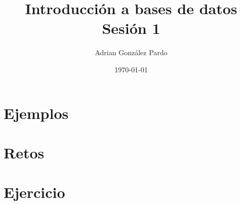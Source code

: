 \documentclass[10pt]{article}
\title{Introducción a bases de datos\\Sesión 1}
\author{Adrian González Pardo}
\date{\today}
\begin{document}
\maketitle
\section{Ejemplos}
\begin{center}
  
  
  
\end{center}
\section{Retos}
\begin{center}
  
  
  
\end{center}
\section{Ejercicio}
\begin{center}
  
\end{center}
\end{document}
